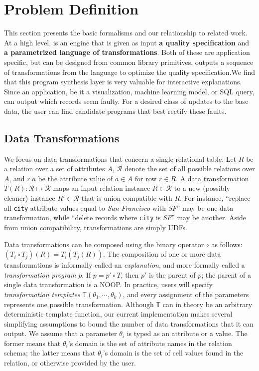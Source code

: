 \section{Problem Definition}
This section presents the basic \sys formalisms and our relationship to related work. At a high level, \sys is an engine that is given as input \textbf{a quality specification} and  \textbf{a parametrized language of transformations}. Both of these are application specific, but can be designed from common library primitives. \sys outputs a sequence of transformations from the language to optimize the quality specification.We find that this program synthesis layer is very valuable for interactive explanations. Since an application, be it a visualization, machine learning model, or SQL query, can output which records seem faulty. For a desired class of updates to  the base data, the user can find candidate programs that best rectify these faults. 

\subsection{Data Transformations}
We focus on data transformations that concern a single relational table. 
Let $R$ be a relation over a set of attributes $A$,  $\mathcal{R}$ denote the set of all possible relations over $A$, and $r.a$ be the attribute value of $a \in A$ for row $r \in R$.
A data transformation $T(R): \mathcal{R} \mapsto \mathcal{R}$ maps an input relation instance $R \in \mathcal{R}$ to a new (possibly cleaner) instance $R' \in \mathcal{R}$ that is union compatible with $R$.  For instance, ``replace all \texttt{city} attribute values equal to {\it San Francisco} with {\it SF}'' may be one data transformation, while ``delete records where \texttt{city} is {\it SF}'' may be another.   
Aside from union compatibility, transformations are simply UDFs.


Data transformations can be composed using the binary operator $\circ$ as follows: $(T_i \circ T_j)(R) =  T_i(T_j(R))$.
The composition of one or more data transformations is informally called an {\it explanation}, and more formally called a {\it transformation program} $p$.   If $p = p' \circ T$, then $p'$ is the parent of $p$; the parent of a single data transformation is a NOOP.  In practice, users will specify {\it transformation templates} $\mathbb{T}(\theta_1,\cdots,\theta_k)$, and every assignment of the parameters represents one possible transformation.  
Although $\mathbb{T}$ can in theory be an arbitrary deterministic template function, our current implementation makes several simplifying assumptions to bound the number of data transformations that it can output.  We assume that a parameter $\theta_i$ is typed as an attribute or a value.  The former means that $\theta_i$'s domain is the set of attribute names in the relation schema; the latter means that $\theta_i$'s domain is the set of cell values found in the relation, or otherwise provided by the user. 

